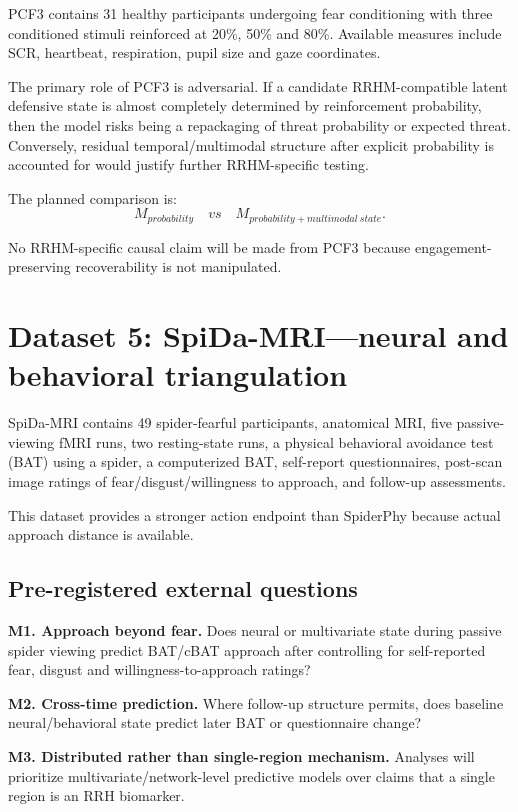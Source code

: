 \documentclass[11pt]{article}
\begin{document}
PCF3 contains 31 healthy participants undergoing fear conditioning with three conditioned stimuli reinforced at 20\%, 50\% and 80\%. Available measures include SCR, heartbeat, respiration, pupil size and gaze coordinates.

The primary role of PCF3 is adversarial. If a candidate RRHM-compatible latent defensive state is almost completely determined by reinforcement probability, then the model risks being a repackaging of threat probability or expected threat. Conversely, residual temporal/multimodal structure after explicit probability is accounted for would justify further RRHM-specific testing.

The planned comparison is:
\[
M_{probability}\quad vs\quad M_{probability+multimodal\ state}.
\]

No RRHM-specific causal claim will be made from PCF3 because engagement-preserving recoverability is not manipulated.

\section{Dataset 5: SpiDa-MRI---neural and behavioral triangulation}

SpiDa-MRI contains 49 spider-fearful participants, anatomical MRI, five passive-viewing fMRI runs, two resting-state runs, a physical behavioral avoidance test (BAT) using a spider, a computerized BAT, self-report questionnaires, post-scan image ratings of fear/disgust/willingness to approach, and follow-up assessments.

This dataset provides a stronger action endpoint than SpiderPhy because actual approach distance is available.

\subsection{Pre-registered external questions}

\textbf{M1. Approach beyond fear.} Does neural or multivariate state during passive spider viewing predict BAT/cBAT approach after controlling for self-reported fear, disgust and willingness-to-approach ratings?

\textbf{M2. Cross-time prediction.} Where follow-up structure permits, does baseline neural/behavioral state predict later BAT or questionnaire change?

\textbf{M3. Distributed rather than single-region mechanism.} Analyses will prioritize multivariate/network-level predictive models over claims that a single region is an RRH biomarker.
\end{document}
